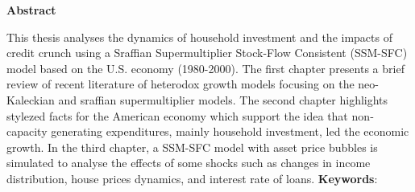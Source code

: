 \begin{center}
  \large{\textbf{Abstract}}
\end{center}

This thesis analyses the dynamics of household investment and the impacts of credit crunch using a Sraffian Supermultiplier Stock-Flow Consistent (SSM-SFC) model based on the U.S. economy (1980-2000). The first chapter presents a brief review of recent literature of heterodox growth models focusing on the neo-Kaleckian and sraffian supermultiplier models. The second chapter highlights stylezed facts for the American economy which support the idea that non‐capacity generating expenditures, mainly household investment, led the economic growth. In the third chapter, a SSM-SFC model with asset price bubbles is simulated to analyse the effects of some shocks such as  changes in income distribution, house prices dynamics,  and interest rate of loans.
\vspace{.5cm}
\textbf{Keywords}:

